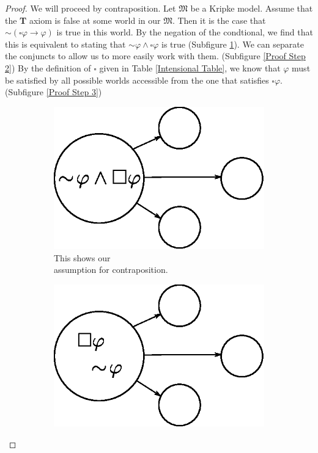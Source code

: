 \documentclass[12pt]{article}
\renewcommand{\phi}{\varphi}
\begin{document}
\begin{proof}
    We will proceed by contraposition. Let $\mathfrak{M}$ be a Kripke model. Assume that the \textbf{T} axiom is false at some 
    world in our $\mathfrak{M}$. Then it is the case that $\sim \! \!(\square \phi \rightarrow \phi)$ is true in this world. By the negation of
    the condtional, we find that this is equivalent to stating that $\sim \! \phi \wedge \square \phi$ is true (Subfigure \ref{Proof Step 1}). We can separate the conjuncts
    to allow us to more easily work with them. (Subfigure \ref{Proof Step 2}) By the definition of $\square$ given in Table \ref{Intensional Table}, we know that $\phi$
    must be satisfied by all possible worlds accessible from the one that satisfies $\square \phi$. (Subfigure \ref{Proof Step 3})
    
    \begin{figure}[h]
        \centering
        \begin{subfigure}{0.27\textwidth}
            \centering
            \includegraphics[width=\textwidth]{proof1.eps}
            \caption{This shows our \\ assumption for contraposition.}
            \label{Proof Step 1}
        \end{subfigure}
        \begin{subfigure}{0.27\textwidth}
            \centering
            \includegraphics[width=\textwidth]{proof2.eps}

\end{subfigure}
\end{figure}
\end{proof}
\end{document}
